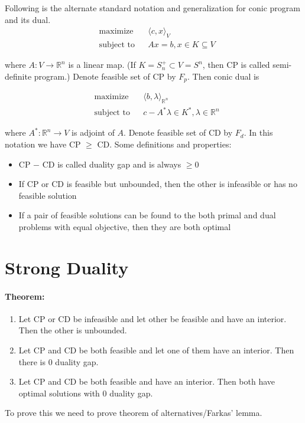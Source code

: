 \documentclass[a4paper,11pt]{article}
\newcommand{\Rn}{\mathbb{R}^n}
\newcommand\inrpd[2]{\langle #1, #2 \rangle}
\begin{document}
Following is the alternate standard notation and generalization for conic program and its dual.
\begin{equation}
\begin{aligned}
& \underset{}{\text{maximize}}
& &\inrpd{c}{x}_V \\
& \text{subject to}
& & Ax = b , x\in K \subseteq V
\end{aligned}
\tag{CP}
\end{equation}

where $A:V \rightarrow \Rn$ is a linear map. (If $K = S_n^+ \subset V = S^n$, then CP is called semi-definite program.)
Denote feasible set of CP by $F_p$. Then conic dual is 

\begin{equation}
\begin{aligned}
& \underset{}{\text{maximize}}
& &\inrpd{b}{\lambda}_{\Rn} \\
& \text{subject to}
& & c - A^*\lambda \in K^* , \lambda \in \Rn 
\end{aligned}
\tag{CD}
\end{equation}

where $A^*:\Rn \rightarrow V$ is adjoint of $A$. Denote feasible set of CD by $F_d$. In this notation we have CP $\geq$ CD. Some definitions and properties:
\begin{itemize}
\item CP $-$ CD is called duality gap and is always $\geq 0$
\item If CP or CD is feasible but unbounded, then the other is infeasible or has no feasible solution
\item If a pair of feasible solutions can be found to the both primal and dual problems with equal objective, then they are both optimal
\end{itemize}

\section{Strong Duality}
\paragraph{Theorem:}
\begin{enumerate}
\item Let CP or CD be infeasible and let other be feasible and have an interior. Then the other is unbounded.
\item Let CP and CD be both feasible and let one of them have an interior. Then there is $0$ duality gap.
\item Let CP and CD be both feasible and have an interior. Then both have optimal solutions with  $0$ duality gap.
\end{enumerate}
To prove this we need to prove theorem of alternatives/Farkas' lemma.
\end{document}
